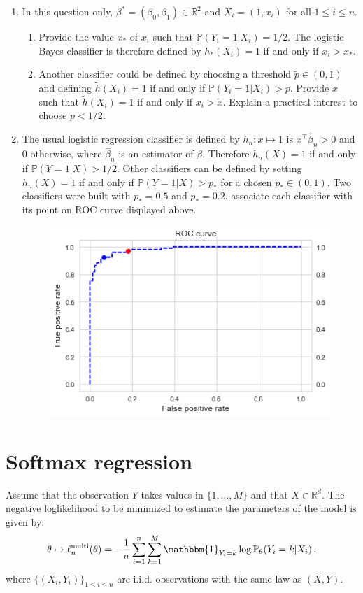\documentclass[a4paper,10pt,fleqn]{article}
\newcommand{\rset}{\ensuremath{\mathbb{R}}}
\newcommand{\1}{\ensuremath{\mathbbm{1}}}
\begin{document}
\begin{enumerate}

	\item In this question only,  $\beta^* = (\beta_0,\beta_1)\in \rset^2$ and $X_i = (1,x_i)$ for all $1\leqslant i \leqslant n$.

\begin{enumerate}
\item Provide the value $x_*$ of $x_i$ such that $\mathbb{P}(Y_i=1 | X_i) = 1/2$. The logistic Bayes classifier is therefore defined by $h_*(X_i) = 1$ if and only if $x_i>x_*$. 
\item Another classifier could be defined by choosing a threshold $\tilde p\in(0,1)$ and defining $\tilde h(X_i) = 1$ if and only if $\mathbb{P}(Y_i=1 | X_i) > \tilde p$.  Provide $\tilde x$ such that $\tilde h(X_i) = 1$ if and only if $x_i>\tilde x$. Explain a practical interest to choose $\tilde p < 1/2$.
\end{enumerate}
	\item The usual logistic regression classifier is defined by $h_n:x\mapsto 1$ is $x^\top\hat\beta_n >0$ and $0$ otherwise, where $\hat \beta_n$ is an estimator of $\beta$. Therefore $h_n(X) =1$ if and only if $\mathbb{P}(Y=1|X)>1/2$. Other classifiers can be defined by setting $h_n(X) =1$ if and only if $\mathbb{P}(Y=1|X)>p_*$ for a chosen $p_*\in(0,1)$. Two classifiers were built with $p_* = 0.5$ and $p_* = 0.2$, associate each classifier with its point on  ROC curve displayed above.

\begin{figure}[h!]
\label{fig:roc}
\centering
\includegraphics[scale = .55]{roc.png}
\end{figure}
	
\end{enumerate}

\section{Softmax regression}
Assume that the observation $Y$ takes values in $\{1,\ldots,M\}$ and that $X\in\mathbb{R}^d$. The negative loglikelihood to be minimized to estimate the parameters of the model is given by:
$$
\theta \mapsto \ell^{\mathrm{multi}}_n(\theta)= -\frac{1}{n} \sum_{i=1}^n\sum_{k=1}^{M} \1_{Y_i=k}\log \mathbb{P}_{\theta}(Y_i = k | X_i)\,,
$$
where $\{(X_i,Y_i)\}_{1\leqslant i\leqslant n}$ are i.i.d. observations with the same law as $(X,Y)$. 
\end{document}

